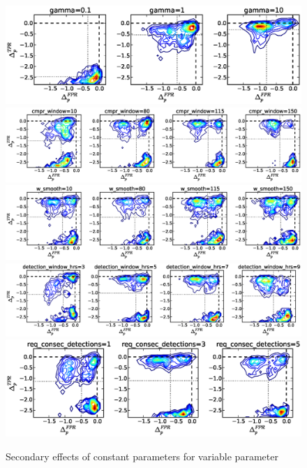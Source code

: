 \begin{figure}[!h]
\begin{center}
\includegraphics[width=6in]{../fig/final/delta_hist_sec/threshold/gamma}
\includegraphics[width=6in]{../fig/final/delta_hist_sec/threshold/cmpr_window}
\includegraphics[width=6in]{../fig/final/delta_hist_sec/threshold/w_smooth}
\includegraphics[width=6in]{../fig/final/delta_hist_sec/threshold/detection_window_hrs}
\includegraphics[width=6in]{../fig/final/delta_hist_sec/threshold/req_consec_detections}
\end{center}
\caption{\label{fig:delta_sec3} Secondary effects of constant parameters for variable parameter }
\end{figure}

